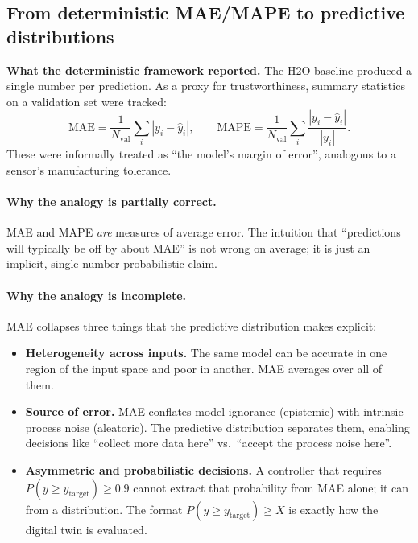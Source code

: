 \documentclass[11pt,a4paper]{article}
\begin{document}
\subsection{From deterministic MAE/MAPE to predictive distributions}
\label{sec:mae-to-distribution}

\begin{recapbox}
\textbf{What the deterministic framework reported.} The H2O baseline produced a single number per prediction. As a proxy for trustworthiness, summary statistics on a validation set were tracked:
\[
\text{MAE} = \frac{1}{N_{\text{val}}}\sum_i |y_i - \hat y_i|,
\qquad
\text{MAPE} = \frac{1}{N_{\text{val}}}\sum_i \frac{|y_i - \hat y_i|}{|y_i|}.
\]
These were informally treated as ``the model's margin of error'', analogous to a sensor's manufacturing tolerance.
\end{recapbox}

\paragraph{Why the analogy is partially correct.} MAE and MAPE \emph{are} measures of average error. The intuition that ``predictions will typically be off by about MAE'' is not wrong on average; it is just an implicit, single-number probabilistic claim.

\paragraph{Why the analogy is incomplete.} MAE collapses three things that the predictive distribution makes explicit:
\begin{itemize}
    \item \textbf{Heterogeneity across inputs.} The same model can be accurate in one region of the input space and poor in another. MAE averages over all of them.
    \item \textbf{Source of error.} MAE conflates model ignorance (epistemic) with intrinsic process noise (aleatoric). The predictive distribution separates them, enabling decisions like ``collect more data here'' vs.\ ``accept the process noise here''.
    \item \textbf{Asymmetric and probabilistic decisions.} A controller that requires $P(y \geq y_{\text{target}}) \geq 0.9$ cannot extract that probability from MAE alone; it can from a distribution. The format $P(y \geq y_{\text{target}}) \geq X$ is exactly how the digital twin is evaluated.
\end{itemize}
\end{document}
